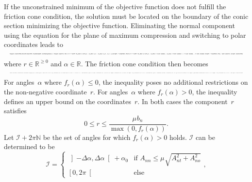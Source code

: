 \documentclass[global,twocolumn]{svjour}
\let\vec\bm
\newcommand{\intervalOO}[2]{\ensuremath{\left] #1, #2 \right[}}
\newcommand{\intervalCO}[2]{\ensuremath{\left[ #1, #2 \right[}}
\newcommand{\R}{\mathbb{R}}
\newcommand{\transp}{{\mathrm{T}}}
\newcommand{\cof}[1]{\ensuremath{\mu_{#1}}}
\newcommand{\atan}[1]{\operatorname{atan#1}}
\newcommand{\shrinkeqnnew}[2]{\resizebox{#1\linewidth}{!}{\begin{varwidth}[t]{2\linewidth}\ensuremath{\displaystyle{#2}}\end{varwidth}}}
\begin{document}
			If the unconstrained minimum of the objective function does not fulfill the friction cone condition,
			the solution must be located on the boundary of the conic section minimizing the objective function.
			Eliminating the normal component using the equation for the plane of
			maximum compression and switching to polar coordinates leads to
			\begin{equation*}
				\shrinkeqnnew{1}{
				\begin{split}
					\vec x & = \left(A_{nn}^{-1}(b_n - A_{nt} x_t - A_{no} x_o), x_t, x_o\right)^\transp \\
					       & = \left(A_{nn}^{-1}(b_n - A_{nt} r \cos \alpha - A_{no} r \sin \alpha), r \cos \alpha, r \sin \alpha\right)^\transp,
				\end{split}
				}
			\end{equation*}
			where $r \in \R^{\geq 0}$ and $\alpha \in \R$. The friction cone
			condition then becomes
			\begin{equation*}
				\shrinkeqnnew{1}{
				\begin{split}
					                          & \norm{\vec x_{to}}_2 \leq \cof{} A_{nn}^{-1}(b_n - A_{nt} x_t - A_{no} x_o) \\
					\leftrightarrow \quad & r (A_{nn} + \cof{} A_{nt} \cos \alpha + \cof{} A_{no} \sin \alpha) \leq \cof{} b_n \\
					\leftrightarrow \quad & r \underbrace{(A_{nn} + \cof{} \sqrt{A_{nt}^2 + A_{no}^2} \cos (\alpha - \atan2(A_{no}, A_{nt})))}_{=f_r(\alpha)} \leq \cof{} b_n.
				\end{split}
				}
			\end{equation*}
			For angles~$\alpha$ where $f_r(\alpha) \leq 0$, the inequality poses
			no additional restrictions on the non-negative coordinate~$r$. For
			angles~$\alpha$ where $f_r(\alpha) > 0$, the inequality defines an
			upper bound on the coordinates~$r$. In both cases the component~$r$
			satisfies
			\begin{equation*}
				0 \leq r \leq \frac{\cof{} b_n}{\max(0, f_r(\alpha))}.
			\end{equation*}
			Let $\mathcal{I} + 2\pi \mathbb{N}$ be the set of angles for which
			$f_r(\alpha) > 0$ holds. $\mathcal{I}$ can be determined to be
			\begin{equation}
				\mathcal{I} = \begin{cases}
					\intervalOO{-\Delta \alpha}{\Delta \alpha} + \alpha_0 & \text{if $A_{nn} \leq \cof{} \sqrt{A_{nt}^2 + A_{no}^2}$} \\
					\intervalCO{0}{2\pi} & \text{else}
				\end{cases},
				\label{eq:feasible}
			\end{equation}
\end{document}
